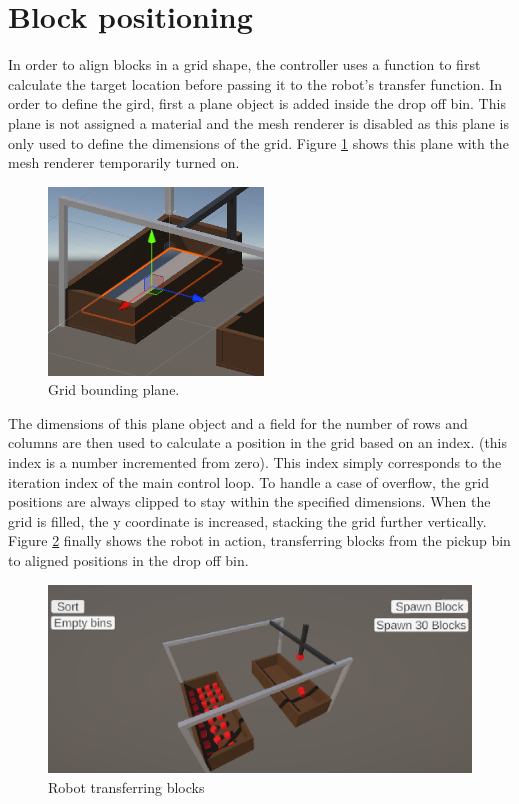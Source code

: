 \documentclass{report}
\begin{document}
\section{Block positioning}

In order to align blocks in a grid shape, the controller uses a function to first calculate the target location before passing it to the robot's transfer function. In order to define the gird, first a plane object is added inside the drop off bin. This plane is not assigned a material and the mesh renderer is disabled as this plane is only used to define the dimensions of the grid.
Figure \ref{fig:plane} shows this plane with the mesh renderer temporarily turned on.

\begin{figure}[H]
\centering
\includegraphics[height=50mm, keepaspectratio]{report_images/plane.png}
\caption{Grid bounding plane.}
\label{fig:plane}
\end{figure}

The dimensions of this plane object and a field for the number of rows and columns are then used to calculate a position in the grid based on an index. (this index is a number incremented from zero). This index simply corresponds to the iteration index of the main control loop. To handle a case of overflow, the grid positions are always clipped to stay within the specified dimensions. When the grid is filled, the y coordinate is increased, stacking the grid further vertically.\\
\newline
Figure \ref{fig:sort} finally shows the robot in action, transferring blocks from the pickup bin to aligned positions in the drop off bin.
\begin{figure}[H]
\centering
\includegraphics[height=50mm, keepaspectratio]{report_images/sorting.png}
\caption{Robot transferring blocks}
\label{fig:sort}
\end{figure}
\end{document}
